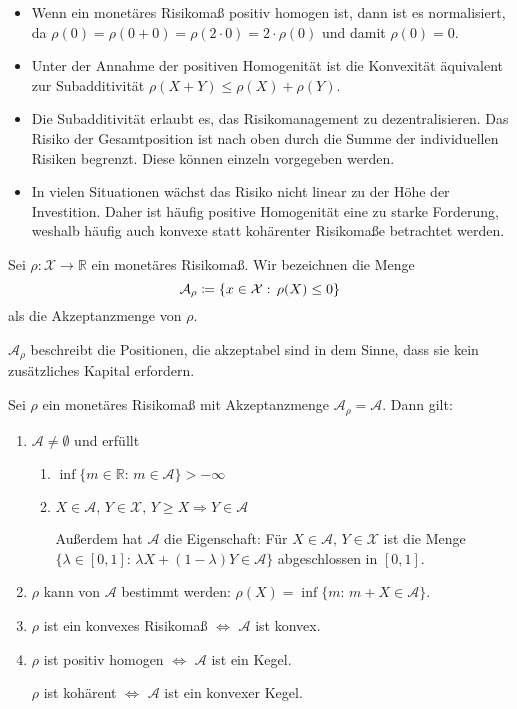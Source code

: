 \documentclass[a4paper,twoside,DIV15,BCOR12mm]{scrbook}
\begin{document}
\begin{bemerkung}
\begin{itemize}
\item Wenn ein monetäres Risikomaß positiv homogen ist, dann ist es normalisiert, da $\rho(0)=\rho(0+0)=\rho(2\cdot 0)=2\cdot \rho(0)$ und damit $\rho(0)=0$.
\item Unter der Annahme der positiven Homogenität ist die Konvexität äquivalent zur Subadditivität $\rho(X+Y)\leq \rho(X)+\rho (Y)$.
\item Die Subadditivität erlaubt es, das Risikomanagement zu dezentralisieren. Das Risiko der Gesamtposition ist nach oben durch die Summe der individuellen Risiken begrenzt. Diese können einzeln vorgegeben werden.
\item In vielen Situationen wächst das Risiko nicht linear zu der Höhe der Investition. Daher ist häufig positive Homogenität eine zu starke Forderung, weshalb häufig auch konvexe statt kohärenter Risikomaße betrachtet werden.
\end{itemize}
\end{bemerkung}

\begin{definition}
Sei $\rho:\mathcal{X}\to\mathbb{R}$ ein monetäres Risikomaß. Wir bezeichnen die Menge
\[
\mathcal{A}_\rho\da\{x\in \mathcal{X}:\, \rho(X)\leq 0\}
\]
als die Akzeptanzmenge von $\rho$.

$\mathcal{A}_\rho$ beschreibt die Positionen, die akzeptabel sind in dem Sinne, dass sie kein zusätzliches Kapital erfordern.
\end{definition}

\begin{satz}
Sei $\rho$ ein monetäres Risikomaß mit Akzeptanzmenge $\mathcal{A}_\rho=\mathcal{A}$. Dann gilt:
\begin{enumerate}
\item $\mathcal{A}\neq\emptyset$ und erfüllt

\begin{enumerate}
\item $\inf\{m\in\mathbb{R}:\, m\in\mathcal{A}\}>-\infty$
\item $X\in\mathcal{A},\, Y\in\mathcal{X}, \, Y\geq X \Rightarrow Y\in\mathcal{A}$

Außerdem hat $\mathcal{A}$ die Eigenschaft: Für $X\in\mathcal{A},\, Y\in\mathcal{X}$ ist die Menge $\{\lambda\in[0,1]:\, \lambda X+(1-\lambda) Y\in\mathcal{A}\}$ abgeschlossen in $[0,1]$.
\end{enumerate}

\item $\rho$ kann von $\mathcal{A}$ bestimmt werden: $\rho(X)=\inf\{m:\, m+X\in\mathcal{A}\}$.
\item $\rho$ ist ein konvexes Risikomaß $\Leftrightarrow$ $\mathcal{A}$ ist konvex.
\item $\rho$ ist positiv homogen $\Leftrightarrow$ $\mathcal{A}$ ist ein Kegel.

$\rho$ ist kohärent $\Leftrightarrow$ $\mathcal{A}$ ist ein konvexer Kegel.
\end{enumerate}
\end{satz}
\end{document}
